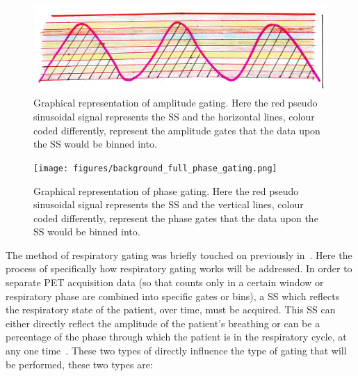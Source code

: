             \begin{figure}
                \centering
                    
                \includegraphics[width=1.0\linewidth]{figures/background_amplitude_gating.png}
                    
                \captionsetup{singlelinecheck=false, justification=raggedright}
                \caption{Graphical representation of amplitude gating. Here the red pseudo sinusoidal signal represents the \gls{SS} and the horizontal lines, colour coded differently, represent the amplitude gates that the data upon the \gls{SS} would be binned into.} \label{fig:respiratory_gating_ampliude_gating}
            \end{figure}
            
            \begin{figure}
                \centering
                    
                \texttt{[image: figures/background\_full\_phase\_gating.png]}
                    
                \captionsetup{singlelinecheck=false, justification=raggedright}
                \caption{Graphical representation of phase gating. Here the red pseudo sinusoidal signal represents the \gls{SS} and the vertical lines, colour coded differently, represent the phase gates that the data upon the \gls{SS} would be binned into.} \label{fig:respiratory_gating_full_phase_gating}
            \end{figure}
            
            The method of respiratory gating was briefly touched on previously in~. Here the process of specifically how respiratory gating works will be addressed. In order to separate \gls{PET} acquisition data (so that counts only in a certain window or respiratory phase are combined into specific gates or bins), a \gls{SS} which reflects the respiratory state of the patient, over time, must be acquired. This \gls{SS} can either directly reflect the amplitude of the patient's breathing or can be a percentage of the phase through which the patient is in the respiratory cycle, at any one time~. These two types of  directly influence the type of gating that will be performed, these two types are:
            

